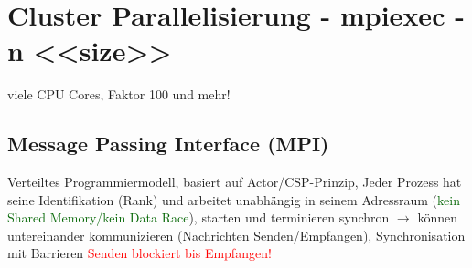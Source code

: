 \section{Cluster Parallelisierung - mpiexec -n <<size>>}

viele CPU Cores, Faktor 100 und mehr!

\subsection{Message Passing Interface (MPI)}

Verteiltes Programmiermodell, basiert auf Actor/CSP-Prinzip, Jeder Prozess hat seine Identifikation (Rank) und arbeitet unabhängig in seinem Adressraum (\textcolor{darkGreen}{kein Shared Memory/kein Data Race}), starten und terminieren synchron $\rightarrow$ können untereinander kommunizieren (Nachrichten Senden/Empfangen), Synchronisation mit Barrieren \textcolor{red}{Senden blockiert bis Empfangen!}


